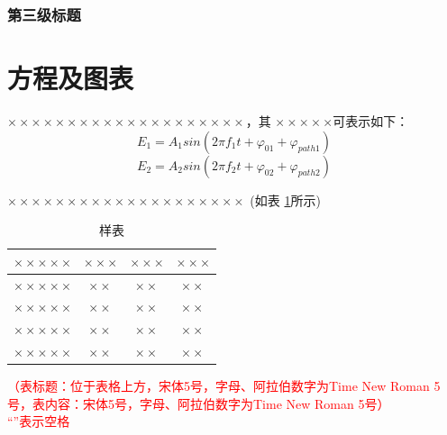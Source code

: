 \documentclass[11pt,a4paper]{article}
\theoremstyle{definition} \newtheorem{law}[thm]{Law}
\theoremstyle{plain} \newtheorem{jury}[thm]{Jury}
\theoremstyle{remark} \newtheorem*{marg}{Margaret}
\newcommand{\reftab}[1]{表 \ref{#1}}
\numberwithin{equation}{section}
\begin{document}
\subsubsection{第三级标题}



\section{方程及图表}
$ \times\times\times\times\times\times\times\times\times\times\times\times\times\times\times\times\times\times\times\times $，其 $ \times\times\times\times\times$可表示如下：
\begin{equation}
	E_{1}=A_{1}sin\!\left(2\pi f_{1}t+\varphi_{01}+\varphi_{path1} \right)
\end{equation}
\begin{equation}
	E_{2}=A_{2}sin\!\left(2\pi f_{2}t+\varphi_{02}+\varphi_{path2} \right)
\end{equation}

$ \times\times\times\times\times\times\times\times\times\times\times\times\times\times\times\times\times\times\times\times $  (如\reftab{table1}所示)

\begin{table}[htpb]
	\centering
	\caption{样表}
	\label{table1}
	\begin{tabular}{cccc}
		\toprule
		$ \times\times\times\times\times $ & $ \times\times\times $ & $ \times\times\times $ & $ \times\times\times $ \\
		\hline
		$ \times\times\times\times\times $ & $ \times\times $       & $ \times\times $       & $ \times\times $       \\
		$ \times\times\times\times\times $ & $ \times\times $       & $ \times\times $       & $ \times\times $       \\
		$ \times\times\times\times\times $ & $ \times\times $       & $ \times\times $       & $ \times\times $       \\ 	    	\cline{2-4}
		$ \times\times\times\times\times $ & $ \times\times $       & $ \times\times $       & $ \times\times $       \\
		\bottomrule
	\end{tabular}
\end{table}
\textcolor{red}{（表标题：位于表格上方，宋体5号，字母、阿拉伯数字为Time New Roman 5号，表内容：宋体5号，字母、阿拉伯数字为Time New Roman 5号）\\ ``\fbox{\phantom{a}}''表示空格}
\end{document}
